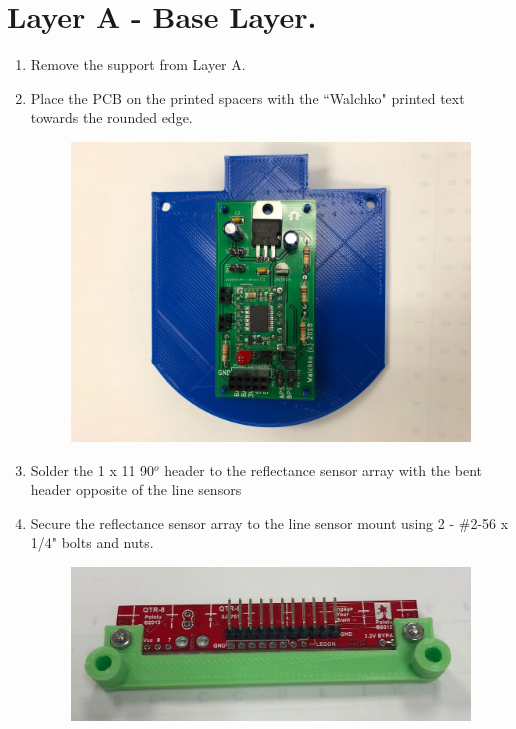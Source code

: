 \documentclass{handout}
\begin{document}
	\section{Layer A - Base Layer.}
	\begin{enumerate}
		\item Remove the support from Layer A.
		\item Place the PCB on the printed spacers with the ``Walchko" printed text towards the rounded edge.
		
		\begin{figure} [H]
			\centering
			\includegraphics[width=.75\textwidth]{1.jpg}
		\end{figure}
	
		\item Solder the 1 x 11 90$^o$ header to the reflectance sensor array with the bent header opposite of the line sensors
		\item Secure the reflectance sensor array to the line sensor mount using 2 - \#2-56 x 1/4" bolts and nuts.
		
		\begin{figure} [H]
			\centering
			\includegraphics[width=.75\textwidth]{2.jpg}
		\end{figure}
	\end{enumerate}
	
\end{document}
